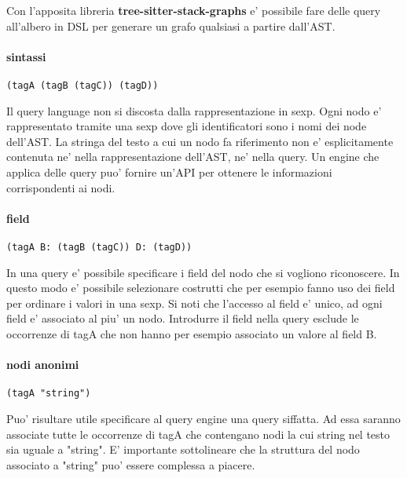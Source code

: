 Con l'apposita libreria \textbf{tree-sitter-stack-graphs} e' possibile fare delle query all'albero in DSL per generare un grafo qualsiasi a partire dall'AST.

\paragraph{sintassi}

\begin{verbatim}
(tagA (tagB (tagC)) (tagD))
\end{verbatim}

Il query language non si discosta dalla rappresentazione in sexp.
Ogni nodo e' rappresentato tramite una sexp dove gli identificatori sono i nomi dei node dell'AST.
La stringa del testo a cui un nodo fa riferimento non e' esplicitamente contenuta ne' nella rappresentazione dell'AST, ne' nella query.
Un engine che applica delle query puo' fornire un'API per ottenere le informazioni corrispondenti ai nodi.

\paragraph{field}

\begin{verbatim}
(tagA B: (tagB (tagC)) D: (tagD))
\end{verbatim}

In una query e' possibile specificare i field del nodo che si vogliono riconoscere.
In questo modo e' possibile selezionare costrutti che per esempio fanno uso dei field per ordinare i valori in una sexp.
Si noti che l'accesso al field e' unico, ad ogni field e' associato al piu' un nodo.
Introdurre il field nella query esclude le occorrenze di tagA che non hanno per esempio associato un valore al field B.

\paragraph{nodi anonimi}

\begin{verbatim}
(tagA "string")
\end{verbatim}

Puo' risultare utile specificare al query engine una query siffatta.
Ad essa saranno associate tutte le occorrenze di tagA che contengano nodi la cui string nel testo sia uguale a "string".
E' importante sottolineare che la struttura del nodo associato a "string" puo' essere complessa a piacere.

